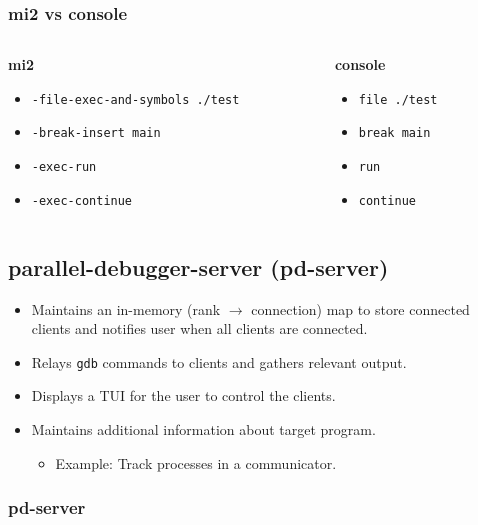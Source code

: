 \documentclass{beamer}
\begin{document}
\begin{frame}
  \frametitle{mi2 vs console}
  \begin{columns}
      \begin{column}{0.5\textwidth}
        \begin{center}
          \textbf{mi2}
          \end{center}
    \begin{itemize}
      \item <1-> \texttt{-file-exec-and-symbols ./test}
      \item <2-> \texttt{-break-insert main}
      \item <3-> \texttt{-exec-run}
      \item <4-> \texttt{-exec-continue}
      \end{itemize}
    \end{column}
    \begin{column}{0.5\textwidth}
      \begin{center}
        \textbf{console}
      \end{center}
      \begin{itemize}
      \item <1-> \texttt{file ./test}
      \item <2-> \texttt{break main}
      \item <3-> \texttt{run}
      \item <4-> \texttt{continue}
      \end{itemize}
    \end{column}
  \end{columns}
\end{frame}

\subsection{parallel-debugger-server (pd-server)}

\begin{frame}
  \begin{itemize}
  \item <1-> Maintains an in-memory (rank $\rightarrow$ connection) map to store connected clients
    and notifies user when all clients are connected.
  \item <2-> Relays \texttt{gdb} commands to clients and gathers relevant output.
  \item <3-> Displays a TUI for the user to control the clients.
  \item <4-> Maintains additional information about target program.
    \begin{itemize}
    \item Example: Track processes in a communicator.
    \end{itemize}
  \end{itemize}
  \frametitle{pd-server}
\end{frame}
\end{document}
